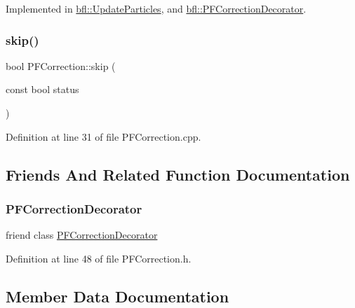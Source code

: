 Implemented in \mbox{\hyperlink{classbfl_1_1UpdateParticles_a89e61d253d077f5c4ca0be6e3b56edd3}{bfl\+::\+Update\+Particles}}, and \mbox{\hyperlink{classbfl_1_1PFCorrectionDecorator_a2574837bfdfa72f3da92b4cdacfe5a89}{bfl\+::\+P\+F\+Correction\+Decorator}}.

\mbox{\label{classbfl_1_1PFCorrection_ab25e625ea12fe257e0eb85d465835e62}} 
\subsubsection{\texorpdfstring{skip()}{skip()}}
{\footnotesize\ttfamily bool P\+F\+Correction\+::skip (\begin{DoxyParamCaption}\item[{const bool}]{status }\end{DoxyParamCaption})}



Definition at line 31 of file P\+F\+Correction.\+cpp.



\subsection{Friends And Related Function Documentation}
\mbox{\label{classbfl_1_1PFCorrection_a58497dd469f7041f127774bccdc78022}} 
\subsubsection{\texorpdfstring{P\+F\+Correction\+Decorator}{PFCorrectionDecorator}}
{\footnotesize\ttfamily friend class \mbox{\hyperlink{classbfl_1_1PFCorrectionDecorator}{P\+F\+Correction\+Decorator}}\hspace{0.3cm}{\ttfamily [friend]}}



Definition at line 48 of file P\+F\+Correction.\+h.



\subsection{Member Data Documentation}
\mbox{\label{classbfl_1_1PFCorrection_aac7b1063a3207bd00547ad5490bbc935}} 
